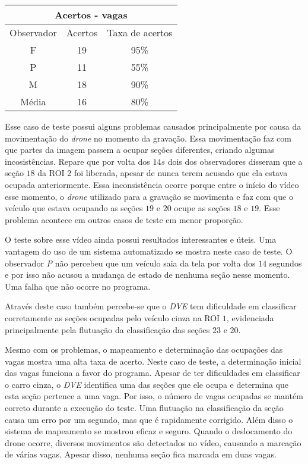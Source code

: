 \begin{center}
\begin{tabular}{|c||c||c|}
\hline
\multicolumn{3}{|c|}{Acertos - vagas}  \\ \hline \hline
Observador & Acertos & Taxa de acertos \\ \hline
F & 19 & 95\% \\  \hline
P & 11 & 55\% \\ \hline
M & 18 & 90\% \\ \hline
Média & 16 & 80\% \\
\hline
\end{tabular}
\end{center}



Esse caso de teste possui alguns problemas causados principalmente por causa da movimentação do \textit{drone} no momento da gravação. Essa movimentação faz com que partes da imagem passem a ocupar seções diferentes, criando algumas incosistências. Repare que por volta dos $14s$ dois dos observadores disseram que a seção $18$ da ROI $2$ foi liberada, apesar de nunca terem acusado que ela estava ocupada anteriormente. Essa inconsistência ocorre porque entre o início do vídeo esse momento, o \textit{drone} utilizado para a gravação se movimenta e faz com que o veículo que estava ocupando as  seções $19$ e $20$ ocupe as seções $18$ e $19$. Esse problema acontece em outros casos de teste em menor proporção.

O teste sobre esse vídeo ainda possui resultados interessantes e úteis. Uma vantagem do uso de um sistema automatizado se mostra neste caso de teste. O observador \textit{P} não percebeu que um veículo saia da tela por volta dos $14$ segundos e por isso não acusou a mudança de estado de nenhuma seção nesse momento. Uma falha que não ocorre no programa.

Através deste caso também percebe-se que o \textit{DVE} tem dificuldade em classificar corretamente as seções ocupadas pelo veículo cinza na ROI $1$, evidenciada principalmente pela flutuação da classificação das seções $23$ e $20$.

Mesmo com os problemas, o mapeamento e determinação das ocupações das vagas mostra uma alta taxa de acerto. Neste caso de teste, a determinação inicial das vagas funciona a favor do programa. Apesar de ter dificuldades em classificar o carro cinza, o \textit{DVE} identifica uma das seções que ele ocupa e determina que esta seção pertence a uma vaga. Por isso, o número de vagas ocupadas se mantém correto durante a execução do teste. Uma flutuação na classificação da seção causa um erro por um segundo, mas que é rapidamente corrigido. Além disso o sistema de mapeamento se mostrou eficaz e seguro. Quando o deslocamento do drone ocorre, diversos movimentos são detectados no vídeo, causando a marcação de várias vagas. Apesar disso, nenhuma seção fica marcada em duas vagas.



